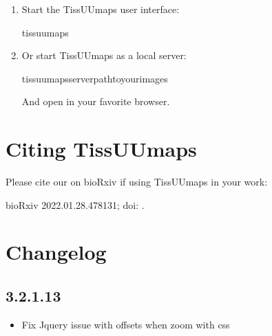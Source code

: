 \documentclass[letterpaper,10pt,english,openany,oneside]{sphinxmanual}
\begin{document}
\begin{enumerate}
\item {} 
\sphinxAtStartPar
Start the TissUUmaps user interface:

\begin{sphinxVerbatim}[commandchars=\\\{\}]
tissuumaps
\end{sphinxVerbatim}

\item {} 
\sphinxAtStartPar
Or start TissUUmaps as a local server:

\begin{sphinxVerbatim}[commandchars=\\\{\}]
tissuumaps\PYGZus{}serverpath\PYGZus{}to\PYGZus{}your\PYGZus{}images
\end{sphinxVerbatim}

\sphinxAtStartPar
And open  in your favorite browser.

\end{enumerate}

\sphinxstepscope


\section{Citing TissUUmaps}
\label{\detokenize{docs/intro/citing:citing-tissuumaps}}\label{\detokenize{docs/intro/citing::doc}}
\sphinxAtStartPar
Please cite our  on bioRxiv if using TissUUmaps in your work:

\sphinxAtStartPar
{}  bioRxiv 2022.01.28.478131; doi: .

\sphinxstepscope


\section{Changelog}
\label{\detokenize{docs/intro/versions:changelog}}\label{\detokenize{docs/intro/versions::doc}}

\subsection{3.2.1.13}
\label{\detokenize{docs/intro/versions:id1}}\begin{itemize}
\item {} 
\sphinxAtStartPar
Fix Jquery issue with offsets when zoom with css

\end{itemize}
\end{document}
